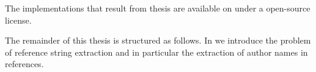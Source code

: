 
The implementations that result from thesis are available on  under a open-source license.


The remainder of this thesis is structured as follows.
In  we introduce the problem of reference string extraction and in particular the extraction of author names in references.


